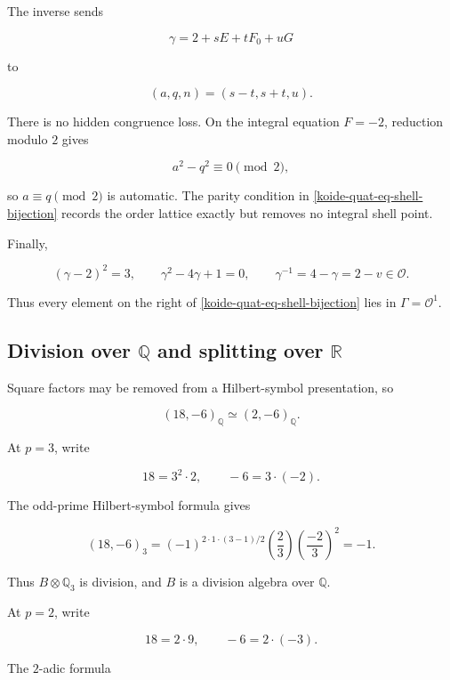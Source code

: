 The inverse sends

\[
 \gamma=2+sE+tF_0+uG
\]

to

\[
 (a,q,n)=(s-t,s+t,u).
\]

There is no hidden congruence loss. On the integral equation \(F=-2\), reduction modulo \(2\) gives

\[
 a^2-q^2\equiv0\pmod2,
\]

so \(a\equiv q\pmod2\) is automatic. The parity condition in \eqref{koide-quat-eq-shell-bijection} records the order lattice exactly but removes no integral shell point.

Finally,

\begin{equation}\label{koide-quat-eq-gamma-quadratic}
 (\gamma-2)^2=3,\qquad
 \gamma^2-4\gamma+1=0,\qquad
 \gamma^{-1}=4-\gamma=2-v\in\mathcal O.
\end{equation}

Thus every element on the right of \eqref{koide-quat-eq-shell-bijection} lies in \(\Gamma=\mathcal O^1\).

\subsection{\texorpdfstring{Division over \(\mathbb Q\) and splitting over \(\mathbb R\)}{Division over \textbackslash mathbb Q and splitting over \textbackslash mathbb R}}\label{koide-quat-division-over-mathbb-q-and-splitting-over-mathbb-r}

Square factors may be removed from a Hilbert-symbol presentation, so

\[
 (18,-6)_{\mathbb Q}\simeq(2,-6)_{\mathbb Q}.
\]

At \(p=3\), write

\[
 18=3^2\cdot2,\qquad -6=3\cdot(-2).
\]

The odd-prime Hilbert-symbol formula gives

\begin{equation}\label{koide-quat-eq-hilbert-three}
 (18,-6)_3
 =(-1)^{2\cdot1\cdot(3-1)/2}
   \left(\frac2{3}\right)
   \left(\frac{-2}{3}\right)^2
 =-1.
\end{equation}

Thus \(B\otimes\mathbb Q_3\) is division, and \(B\) is a division algebra over \(\mathbb Q\).

At \(p=2\), write

\[
 18=2\cdot9,\qquad -6=2\cdot(-3).
\]

The \(2\)-adic formula

